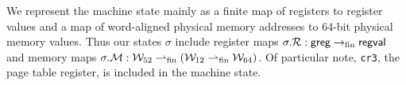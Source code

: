 \label{sec:state}
We represent the machine state mainly as a finite map of registers to register values and a map of word-aligned physical memory addresses 
to 64-bit physical memory values. 
Thus our states $\sigma$ include register maps $\sigma.\mathcal{R}: \mathsf{greg} \rightarrow_{\textrm{fin}} \mathsf{regval} $ and
memory maps $\sigma.\mathcal{M}: \mathcal{W}_{52} \rightharpoonup_{\textrm{fin}} (\mathcal{W}_{12} \rightharpoonup_{\textrm{fin}} \mathcal{W}_{64} )$.
Of particular note, \texttt{cr3}, the page table register, is included in the machine state.


\label{sec:instructions}


